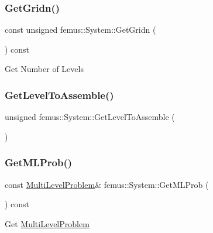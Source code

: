 \subsubsection{\texorpdfstring{Get\+Gridn()}{GetGridn()}}
{\footnotesize\ttfamily const unsigned femus\+::\+System\+::\+Get\+Gridn (\begin{DoxyParamCaption}{ }\end{DoxyParamCaption}) const\hspace{0.3cm}{\ttfamily [inline]}}

Get Number of Levels \mbox{\label{classfemus_1_1_system_a0f1050943e8187087773955c920e3f23}} 
\subsubsection{\texorpdfstring{Get\+Level\+To\+Assemble()}{GetLevelToAssemble()}}
{\footnotesize\ttfamily unsigned femus\+::\+System\+::\+Get\+Level\+To\+Assemble (\begin{DoxyParamCaption}{ }\end{DoxyParamCaption})\hspace{0.3cm}{\ttfamily [inline]}}

\mbox{\label{classfemus_1_1_system_a57025b8e170e8c36141b701a8353a35b}} 
\subsubsection{\texorpdfstring{Get\+M\+L\+Prob()}{GetMLProb()}\hspace{0.1cm}{\footnotesize\ttfamily [1/2]}}
{\footnotesize\ttfamily const \mbox{\hyperlink{classfemus_1_1_multi_level_problem}{Multi\+Level\+Problem}}\& femus\+::\+System\+::\+Get\+M\+L\+Prob (\begin{DoxyParamCaption}{ }\end{DoxyParamCaption}) const\hspace{0.3cm}{\ttfamily [inline]}}

Get \mbox{\hyperlink{classfemus_1_1_multi_level_problem}{Multi\+Level\+Problem}} \mbox{\label{classfemus_1_1_system_ae73a571afd1799365f6a807dfde74641}} 
